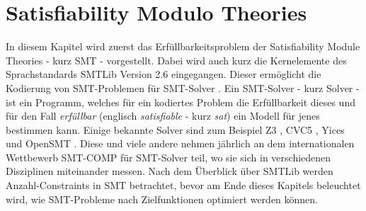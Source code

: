 \chapter{Satisfiability Modulo Theories}
\label{chapter:smt}

In diesem Kapitel wird zuerst das Erfüllbarkeitsproblem der Satisfiability Module Theories - kurz SMT - vorgestellt.
Dabei wird auch kurz die Kernelemente des Sprachstandards SMTLib Version 2.6 \cite{smtlib} eingegangen.
Dieser ermöglicht die Kodierung von SMT-Problemen für SMT-Solver \cite{smt}.
Ein SMT-Solver - kurz Solver - ist ein Programm, welches für ein kodiertes Problem die Erfüllbarkeit dieses und für den
Fall \textit{erfüllbar} (englisch \textit{satisfiable} - kurz \textit{sat}) ein Modell für jenes bestimmen kann.
Einige bekannte Solver sind zum Beispiel Z3 \cite{z3}, CVC5 \cite{cvc5}, Yices \cite{yices} und OpenSMT \cite{opensmt}.
Diese und viele andere nehmen jährlich an dem internationalen Wettbewerb SMT-COMP \cite{smtcomp} für SMT-Solver teil,
wo sie sich in verschiedenen Disziplinen miteinander messen.
Nach dem Überblick über SMTLib werden Anzahl-Constraints in SMT betrachtet,
bevor am Ende dieses Kapitels beleuchtet wird, wie SMT-Probleme nach Zielfunktionen optimiert werden können.

